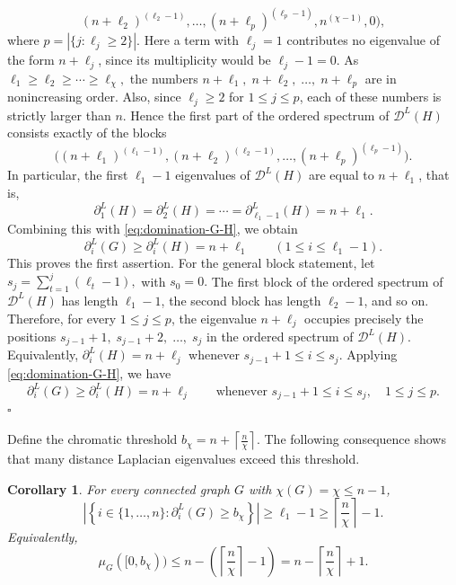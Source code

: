 \documentclass[12pt]{article}
\newcommand{\DL}{\mathcal{D}^{L}}
\newcommand{\ceil}[1]{\left\lceil #1 \right\rceil}
\theoremstyle{plain}
\newtheorem{corollary}[theorem]{Corollary}
\theoremstyle{definition}
\renewenvironment{proof}{{\noindent\bfseries Proof. }}{\hfill$\square$\par}
\begin{document}
\begin{proof}
\[	(n+\ell_2)^{(\ell_2-1)},
	\dots,
	(n+\ell_p)^{(\ell_p-1)},
	n^{(\chi-1)},
	0
	\Big),
	\]
	where $p=|\{j:\ell_j\ge2\}|.$ 
	Here a term with $\ell_j=1$ contributes no eigenvalue of the form $n+\ell_j$, since its multiplicity would be $\ell_j-1=0$.
	As  $\ell_1\ge\ell_2\ge\cdots\ge\ell_\chi,$ the numbers $n+\ell_1,\; n+\ell_2,\;\dots,\; n+\ell_p$ are in nonincreasing order. Also, since $\ell_j\ge2$ for $1\le j\le p$, each of these numbers is strictly larger than $n$. Hence the first part of the ordered spectrum of $\DL(H)$ consists exactly of the blocks
	\[
	\Big((n+\ell_1)^{(\ell_1-1)},
	(n+\ell_2)^{(\ell_2-1)},
	\dots,
	(n+\ell_p)^{(\ell_p-1)}\Big).
	\]
	 In particular, the first $\ell_1-1$ eigenvalues of $\DL(H)$ are equal to $n+\ell_1$, that is,
	\[
	\partial_1^L(H)=\partial_2^L(H)=\cdots=
	\partial_{\ell_1-1}^L(H)=n+\ell_1.
	\]
	Combining this with \eqref{eq:domination-G-H}, we obtain
	\[
	\partial_i^L(G)\ge \partial_i^L(H)=n+\ell_1
	\qquad
	(1\le i\le \ell_1-1).
	\]
	This proves the first assertion. For the general block statement, let  $s_j=\sum_{t=1}^{j}(\ell_t-1),$ with  $s_0=0.$ 
	The first block of the ordered spectrum of $\DL(H)$ has length $\ell_1-1$, the second block has length $\ell_2-1$, and so on. Therefore, for every $1\le j\le p$, the eigenvalue $n+\ell_j$ occupies precisely the positions
	 $s_{j-1}+1,\;s_{j-1}+2,\;\dots,\;s_j$ in the ordered spectrum of $\DL(H)$. Equivalently,
	 $\partial_i^L(H)=n+\ell_j$  whenever $s_{j-1}+1\le i\le s_j.$ Applying \eqref{eq:domination-G-H}, we have 
	\[
	\partial_i^L(G)\ge \partial_i^L(H)=n+\ell_j
	\qquad
	\text{whenever }s_{j-1}+1\le i\le s_j,
	\quad 1\le j\le p.
	\]
\end{proof}

\medskip
\noindent Define the chromatic threshold $b_\chi=n+\ceil{\tfrac{n}{\chi}}.$  The following consequence shows that many distance Laplacian eigenvalues exceed this threshold.

\begin{corollary}\label{cor:many-above-bchi}
For every connected graph $G$ with $\chi(G)=\chi\le n-1$,
\[
    \left|\left\{i\in\{1,
\dots,n\}:\partial_i^L(G)\ge b_\chi\right\}\right|
    \ge \ell_1-1\ge \ceil{\frac{n}{\chi}}-1.
\]
Equivalently,
\[
    \mu_G([0,b_\chi))\le n-\left(\ceil{\frac{n}{\chi}}-1\right)
    =n-\ceil{\frac{n}{\chi}}+1.
\]
\end{corollary}
\end{document}

